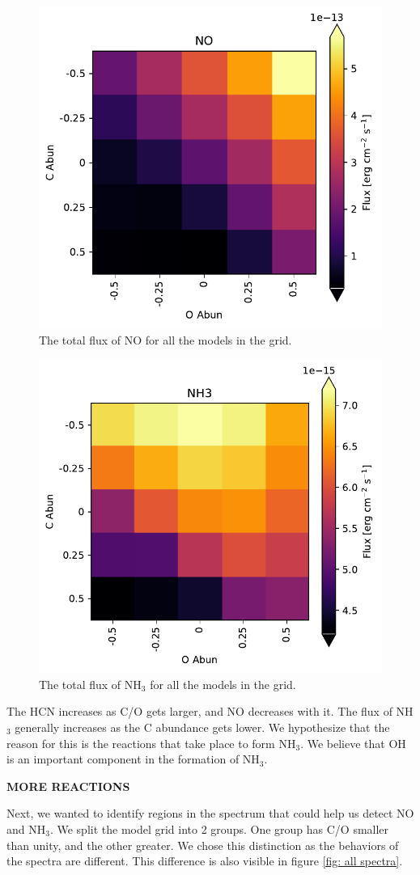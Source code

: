 \documentclass[oneside, single, authoryear, semicolon]{lion-msc}
\newcommand{\4}{$_4$}
\newcommand{\3}{$_3$}
\newcommand{\2}{$_2$}
\begin{document}
\begin{figure}[!ht]
    \centering
    \includegraphics[width=0.5\linewidth]{Figures/NO_heatmap.pdf}
    \caption{The total flux of NO for all the models in the grid.}
    \label{fig: flux NO}
\end{figure}

\begin{figure}[!ht]
    \centering
    \includegraphics[width=0.5\linewidth]{Figures/NH3_heatmap.pdf}
    \caption{The total flux of NH\3 for all the models in the grid.}
    \label{fig: flux NH3}
\end{figure}

The HCN increases as C/O gets larger, and NO decreases with it. The flux of NH\3 generally increases as the C abundance gets lower. We hypothesize that the reason for this is the reactions that take place to form NH\3.
We believe that OH is an important component in the formation of NH\3.


\textbf{MORE REACTIONS}

Next, we wanted to identify regions in the spectrum that could help us detect NO and NH\3. We split the model grid into 2 groups. One group has C/O smaller than unity, and the other greater. We chose this distinction as the behaviors of the spectra are different. This difference is also visible in figure \ref{fig: all spectra}. 
\end{document}
